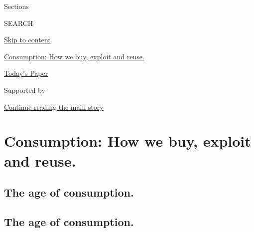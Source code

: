 Sections

SEARCH

\protect\hyperlink{site-content}{Skip to content}

\href{https://www.nytimes.com/issue/fashion/2019/12/16/consumption}{Consumption:
How we buy, exploit and reuse.}

\href{https://myaccount.nytimes.com/auth/login?response_type=cookie\&client_id=vi}{}

\href{https://www.nytimes.com/section/todayspaper}{Today's Paper}

Supported by

\protect\hyperlink{after-sponsor}{Continue reading the main story}

\hypertarget{consumption-how-we-buy-exploit-and-reuse}{%
\section{Consumption: How we buy, exploit and
reuse.}\label{consumption-how-we-buy-exploit-and-reuse}}

\hypertarget{the-age-of-consumption}{%
\subsection{The age of consumption.}\label{the-age-of-consumption}}

\hypertarget{the-age-of-consumption-1}{%
\subsection{The age of consumption.}\label{the-age-of-consumption-1}}

